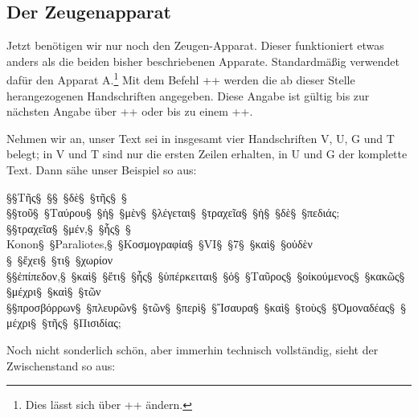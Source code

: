 \begin{reledmacbsp}{\bsplineenum}
\end{reledmacbsp}


\subsection{Der Zeugenapparat}

Jetzt benötigen wir nur noch den Zeugen-Apparat. Dieser funktioniert etwas anders als die beiden bisher beschriebenen 
Apparate. Standardmäßig verwendet \reledmac dafür den Apparat A.\footnote{Dies lässt sich über ++ ändern.} 
Mit dem Befehl ++ werden die ab dieser Stelle herangezogenen Handschriften angegeben. Diese Angabe ist gültig bis 
zur nächsten Angabe über ++ oder bis zu einem +\stopmsdata+.

Nehmen wir an, unser Text sei in insgesamt vier Handschriften V, U, G und T belegt; 
in V und T sind nur die ersten Zeilen erhalten, in U und G der komplette Text. Dann sähe unser Beispiel so aus:

\begin{lfgwcode}{}
§\null§Τῆς§~§§~§δὲ§~§τῆς§~§
§\null§τοῦ§~§Ταύρου§~§ἡ§~§μὲν§~§λέγεται§~§τραχεῖα§~§ἡ§~§δὲ§~§πεδιάς;
§\null§τραχεῖα§~§μέν,§~§ἧς§~§%
{Konon§~§Paraliotes,§~§Κοσμογραφία§~§VI§~§7}§~§καὶ§~§οὐδὲν
§~§ἔχει§~§τι§~§χωρίον
§\null§ἐπίπεδον,§~§καὶ§~§ἔτι§~§ἧς§~§ὑπέρκειται§~§ὁ§~§Ταῦρος§~§οἰκούμενος§~§κακῶς§~§μέχρι§~§καὶ§~§τῶν
§\null§προσβόρρων§~§πλευρῶν§~§τῶν§~§περὶ§~§Ἴσαυρα§~§καὶ§~§τοὺς§~§Ὁμοναδέας§~§μέχρι§~§τῆς§~§Πισιδίας;
\end{lfgwcode}

Noch nicht sonderlich schön, aber immerhin technisch vollständig, sieht der Zwischenstand so aus:

\label{Pilhofer-Beispiel-Lemma-kurz}%
\begin{reledmacbsp}{\bsplineenum}
\end{reledmacbsp}


